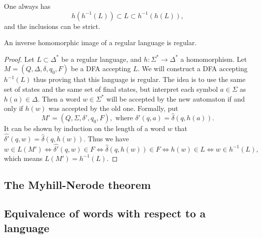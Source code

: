 \begin{page}


One always has
\[
h(h^{-1}(L)) \subset L \subset h^{-1}(h(L)),
\]
and the inclusions can be strict.


\end{page}

\begin{page}

\begin{thm}
An inverse homomorphic image of a regular language is regular.
\end{thm}

\end{page}

\begin{page}

\begin{proof}
Let $L \subset \Delta^*$ be a regular language, and $h \colon \Sigma^* \to \Delta^*$ a homomorphism.
Let $M = (Q, \Delta, \delta, q_0, F)$ be a DFA accepting $L$.
We will construct a DFA accepting $h^{-1}(L)$ thus proving that this language is regular.
The idea is to use the same set of states and the same set of final states, but interpret each symbol $a \in \Sigma$ as $h(a) \in \Delta$.
Then a word $w \in \Sigma^*$ will be accepted by the new automaton if and only if $h(w)$ was accepted by the old one.
Formally, put
\[
M' = (Q, \Sigma, \delta', q_0, F), \text{ where }\delta'(q, a) = \widehat{\delta}(q, h(a)).
\]
It can be shown by induction on the length of a word $w$ that $\widehat{\delta'}(q, w) = \widehat{\delta}(q, h(w))$.
Thus we have
\[
w \in L(M') \Leftrightarrow \widehat{\delta'}(q, w) \in F \Leftrightarrow \widehat{\delta}(q, h(w)) \in F \Leftrightarrow h(w) \in L
\Leftrightarrow w \in h^{-1}(L),
\]
which means $L(M') = h^{-1}(L)$.
\end{proof}






\end{page}

\begin{page}

\section{The Myhill-Nerode theorem}
\subsection{Equivalence of words with respect to a language}

\end{page}


